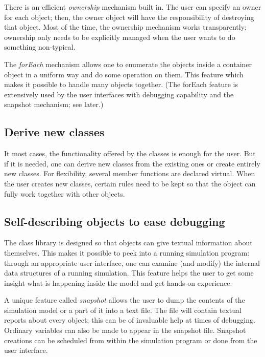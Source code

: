 There is an efficient \textit{ownership} mechanism
built in. The user can specify an owner for each object; then, the
owner object will have the responsibility of destroying that object.
Most of the time, the ownership mechanism works transparently;
ownership only needs to be explicitly managed when the user wants to
do something non-typical.


The \textit{forEach} mechanism allows one to
enumerate the objects inside a container object in a uniform way and
do some operation on them. This feature which makes it possible to
handle many objects together. (The forEach feature is extensively used
by the user interfaces with debugging capability and the snapshot
mechanism; see later.)


\subsection{Derive new classes}

It most cases, the functionality offered by the {\opp} classes
is enough for the user. But if it is needed, one can derive new
classes from the existing ones or create entirely new classes.
For flexibility, several member functions are declared virtual.
When the user creates new classes, certain rules need to be kept
so that the object can fully work together with other objects.


\subsection{Self-describing objects to ease debugging}

The class library is designed so that objects can give textual
information about themselves. This makes it possible to peek
into a running simulation program: through an appropriate user
interface, one can examine (and modify) the internal data structures
of a running simulation. This feature helps the user to get some
insight what is happening inside the model and get hands-on experience.


A unique feature called \textit{snapshot} allows the
user to dump the contents of the simulation model or a part of it into
a text file. The file will contain textual reports about every object;
this can be of invaluable help at times of debugging. Ordinary
variables can also be made to appear in the snapshot file. Snapshot
creations can be scheduled from within the simulation program or done
from the user interface.



